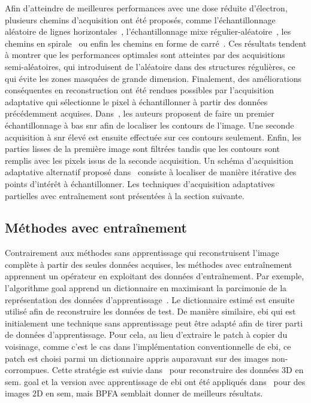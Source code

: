 Afin d'atteindre de meilleures performances avec une dose réduite d'électron, plusieurs chemins d'acquisition ont été proposés, comme l'échantillonnage aléatoire de lignes horizontales~\cite{kovarik2016implementation,han2018optimal}, l'échantillonnage mixe régulier-aléatoire~\cite{stevens2018apl}, les chemins en spirale~\cite{sang2017dynamic,li2018compressive,han2018optimal} ou enfin les chemins en forme de carré~\cite{han2018optimal}.
%
Ces résultats tendent à montrer que les performances optimales sont atteintes par des acquisitions semi-aléatoires, qui introduisent de l'aléatoire dans des structures régulières, ce qui évite les zones masquées de grande dimension. %
%
Finalement, des améliorations conséquentes en reconstruction ont été rendues possibles par l'acquisition adaptative qui sélectionne le pixel à échantillonner à partir des données précédemment acquises. Dans~\cite{dahmen2016feature}, les auteurs proposent de faire un premier échantillonnage à bas \gls{snr} afin de localiser les contours de l'image. Une seconde acquisition à \gls{snr} élevé est ensuite effectuée sur ces contours seulement. Enfin, les parties lisses de la première image sont filtrées tandis que les contours sont remplis avec les pixels issus de la seconde acquisition. Un schéma d'acquisition adaptative alternatif proposé dans~\cite{dahmen2019adaptive} consiste à localiser de manière itérative des points d'intérêt à échantillonner. Les techniques d'acquisition adaptatives partielles avec entraînement sont présentées à la section suivante.

\subsection{Méthodes avec entraînement}

Contrairement aux méthodes sans apprentissage qui reconstruisent l'image complète à partir des seules données acquises, les méthodes avec entraînement apprennent un opérateur en exploitant des données d'entraînement. Par exemple, l'algorithme \gls{goal} apprend un dictionnaire en maximisant la parcimonie de la représentation des données d'apprentissage~\cite{hawe2013analysis}. Le dictionnaire estimé est ensuite utilisé afin de reconstruire les données de test. De manière similaire, \gls{ebi} qui est initialement une technique sans apprentissage peut être adapté afin de tirer parti de données d'apprentissage. Pour cela, au lieu d'extraire le patch à copier du voisinage, comme c'est le cas dans l'implémentation conventionnelle de \gls{ebi}, ce patch est choisi parmi un dictionnaire appris auparavant sur des images non-corrompues. Cette stratégie est suivie dans~\cite{trampert2018exemplar} pour reconstruire des données 3D en \gls{sem}. \gls{goal} et la version avec apprentissage de \gls{ebi} ont été appliqués dans~\cite{trampert2018ultramicroscopy} pour des images 2D en \gls{sem}, mais BPFA semblait donner de meilleurs résultats.

